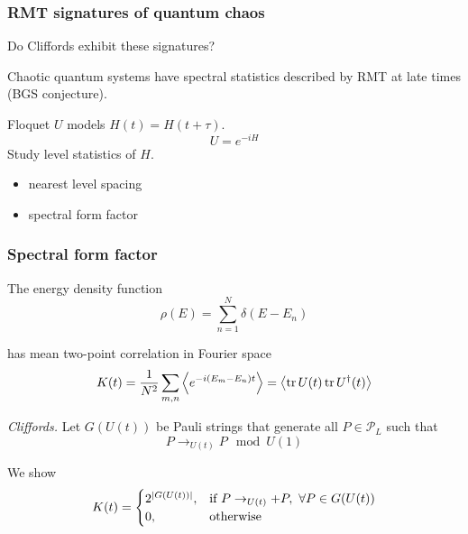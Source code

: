 \documentclass[9pt]{beamer}
\begin{document}
\begin{frame}
\frametitle{RMT signatures of quantum chaos}

Do Cliffords exhibit these signatures?

\pause
Chaotic quantum systems have spectral statistics described by RMT at late times (BGS conjecture).

\pause
\vspace{0.5cm}
Floquet $U$ models $H(t) = H(t+\tau)$.
\begin{equation}
U = e^{-iH}
\end{equation}
Study level statistics of $H$.

\pause
\vspace{0.5cm}
\begin{itemize}
\item<+-> nearest level spacing 
\item<+-> spectral form factor
\end{itemize}

\end{frame}


\begin{frame}
\frametitle{Spectral form factor}

The energy density function
\begin{equation}
\rho(E) = \sum_{n=1}^N \delta(E-E_n)
\end{equation}

has mean two-point correlation in Fourier space
\begin{equation}
K(t) 
= \frac{1}{N^2} \sum_{m,n} \ev{ e^{-i(E_m-E_n)t} }
= \ev{ \trace{U(t)} \trace{U^\dagger(t)} }
\end{equation}

\pause
\emph{Cliffords.} Let $G(U(t))$ be Pauli strings that generate all $P \in \mathcal{P}_L$ such that 
\begin{equation}
P \rightarrow_{U(t)} P \mod U(1)
\end{equation}

We show
\begin{equation}
K(t) = 
\begin{cases}
2^{\abs{G(U(t))}}, & \text{if } P \rightarrow_{U(t)} +P, \ \forall P \in G(U(t)) \\
0, 				   & \text{otherwise}
\end{cases}
\end{equation} 


\end{frame}
\end{document}
